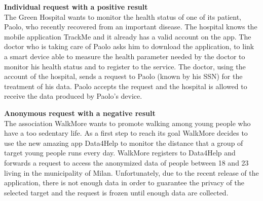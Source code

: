 \documentclass{article}
\begin{document}
\begin{legal}
\begin{legal}
\begin{legal}
{\begin{legal}
		\item \textbf{Individual request with a positive result}\\
 
The Green Hospital wants to monitor the health status of one of its patient, Paolo, who recently recovered from an important disease. The hospital knows the mobile application TrackMe and it already has a valid account on the app. The doctor who is taking care of Paolo asks him to download the application, to link a smart device able to measure the health parameter needed by the doctor to monitor his health status and to register to the service. The doctor, using the account of the hospital, sends a request to Paolo (known by his SSN) for the treatment of his data. Paolo accepts the request and the hospital is allowed to receive the data produced by Paolo’s device.\\

		\item \textbf{Anonymous request with a negative result}\\

The association WalkMore wants to promote walking among young people who have a too sedentary life. As a first step to reach its goal WalkMore decides to use the new amazing app Data4Help to monitor the distance that a group of target young people runs every day. WalkMore registers to Data4Help and forwards a request to access the anonymized data of people between 18 and 23 living in the municipality of Milan. Unfortunately, due to the recent release of the application, there is not enough data in order to guarantee the privacy of the selected target and the request is frozen until enough data are collected.  \\


\end{legal}}
\end{legal}
\end{legal}
\end{legal}
\end{document}
